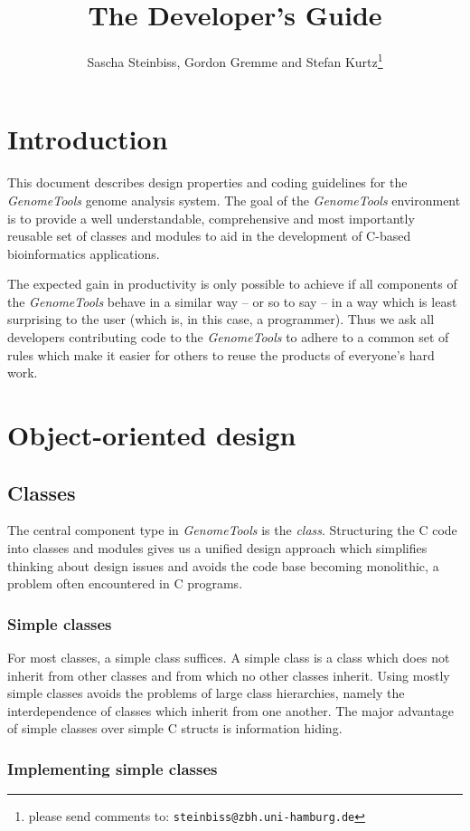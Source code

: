 \documentclass[11pt,final]{article}
\title{The \Gt Developer's Guide}
\author{Sascha Steinbiss, Gordon Gremme and Stefan Kurtz\thanks{please send comments to: \texttt{steinbiss@zbh.uni-hamburg.de}}}
\newcommand{\Gt}[0]{\emph{GenomeTools}\xspace}
\begin{document}
\maketitle
\tableofcontents


\section{Introduction}
This document describes design properties and coding guidelines for the \Gt
genome analysis system. The goal of the \Gt environment is to provide a
well understandable, comprehensive and most importantly reusable set of classes
and modules to aid in the development of C-based bioinformatics applications. 

The expected gain in productivity is only possible to achieve if all
components of the \Gt behave in a similar way -- or so to say -- in a way which
is least surprising to the user (which is, in this case, a programmer).
Thus we ask all developers contributing code to the \Gt to adhere to a common
set of rules which make it easier for others to reuse the products of
everyone's hard work.


\section{Object-oriented design}
\subsection{Classes}

The central component type in \Gt is the \emph{class}. Structuring the C code
into classes and modules gives us a unified design approach which simplifies
thinking about design issues and avoids the code base becoming monolithic, a
problem often encountered in C programs.

\subsubsection{Simple classes}

For most classes, a simple class suffices. A simple class is a class which does
not inherit from other classes and from which no other classes inherit. Using
mostly simple classes avoids the problems of large class hierarchies, namely
the interdependence of classes which inherit from one another. The major
advantage of simple classes over simple C structs is information hiding.

\subsubsection{Implementing simple classes}
\label {simpleclasses}
\end{document}
